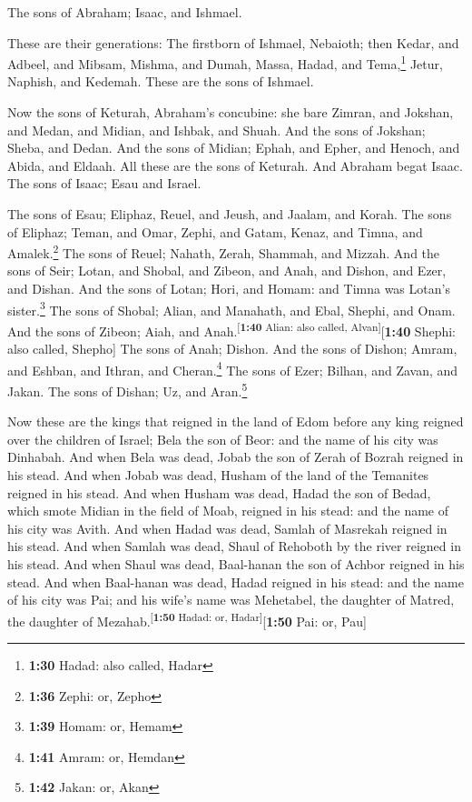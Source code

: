  The sons of Abraham; Isaac, and Ishmael.

 These are their generations: The firstborn of Ishmael,
Nebaioth; then Kedar, and Adbeel, and Mibsam,  Mishma,
and Dumah, Massa, Hadad, and Tema,\footnote{\textbf{1:30} Hadad: also
  called, Hadar}  Jetur, Naphish, and Kedemah. These are
the sons of Ishmael.

 Now the sons of Keturah, Abraham's concubine: she bare
Zimran, and Jokshan, and Medan, and Midian, and Ishbak, and Shuah. And
the sons of Jokshan; Sheba, and Dedan.  And the sons of
Midian; Ephah, and Epher, and Henoch, and Abida, and Eldaah. All these
are the sons of Keturah.  And Abraham begat Isaac. The
sons of Isaac; Esau and Israel.

 The sons of Esau; Eliphaz, Reuel, and Jeush, and Jaalam,
and Korah.  The sons of Eliphaz; Teman, and Omar, Zephi,
and Gatam, Kenaz, and Timna, and Amalek.\footnote{\textbf{1:36} Zephi:
  or, Zepho}  The sons of Reuel; Nahath, Zerah, Shammah,
and Mizzah.  And the sons of Seir; Lotan, and Shobal, and
Zibeon, and Anah, and Dishon, and Ezer, and Dishan.  And
the sons of Lotan; Hori, and Homam: and Timna was Lotan's
sister.\footnote{\textbf{1:39} Homam: or, Hemam}  The
sons of Shobal; Alian, and Manahath, and Ebal, Shephi, and Onam. And the
sons of Zibeon; Aiah, and Anah.\textsuperscript{{[}\textbf{1:40} Alian:
also called, Alvan{]}}{[}\textbf{1:40} Shephi: also called, Shepho{]}
 The sons of Anah; Dishon. And the sons of Dishon; Amram,
and Eshban, and Ithran, and Cheran.\footnote{\textbf{1:41} Amram: or,
  Hemdan}  The sons of Ezer; Bilhan, and Zavan, and
Jakan. The sons of Dishan; Uz, and Aran.\footnote{\textbf{1:42} Jakan:
  or, Akan}

 Now these are the kings that reigned in the land of Edom
before any king reigned over the children of Israel; Bela the son of
Beor: and the name of his city was Dinhabah.  And when
Bela was dead, Jobab the son of Zerah of Bozrah reigned in his stead.
 And when Jobab was dead, Husham of the land of the
Temanites reigned in his stead.  And when Husham was
dead, Hadad the son of Bedad, which smote Midian in the field of Moab,
reigned in his stead: and the name of his city was Avith.
 And when Hadad was dead, Samlah of Masrekah reigned in
his stead.  And when Samlah was dead, Shaul of Rehoboth
by the river reigned in his stead.  And when Shaul was
dead, Baal-hanan the son of Achbor reigned in his stead. 
And when Baal-hanan was dead, Hadad reigned in his stead: and the name
of his city was Pai; and his wife's name was Mehetabel, the daughter of
Matred, the daughter of Mezahab.\textsuperscript{{[}\textbf{1:50} Hadad:
or, Hadar{]}}{[}\textbf{1:50} Pai: or, Pau{]}

